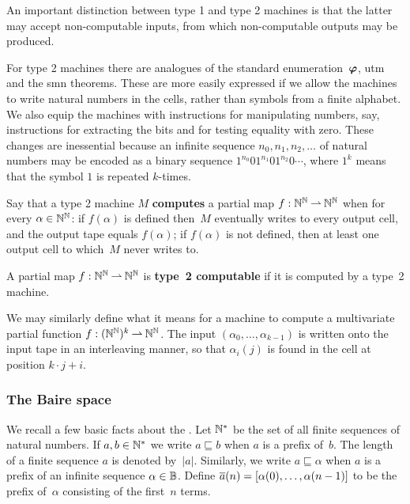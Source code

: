 An important distinction between type 1 and type 2 machines is that
the latter may accept non-computable inputs, from which non-computable
outputs may be produced.

For type 2 machines there are analogues of the standard
enumeration~$\text{\boldmath{$\varphi$}}$, utm and the smn theorems. These are more easily
expressed if we allow the machines to write natural numbers in the
cells, rather than symbols from a finite alphabet. We also equip the
machines with instructions for manipulating numbers, say, instructions
for extracting the bits and for testing equality with zero. These
changes are inessential because an infinite sequence $n_0, n_1, n_2,
\ldots$ of natural numbers may be encoded as a binary sequence
$1^{n_0}01^{n_1}01^{n_2}0\cdots$, where $1^k$ means that the symbol
$1$ is repeated $k$-times.

\begin{definition}
  Say that a type 2 machine $M$ \textbf{computes} a partial map $f : \mathbb{N}^{\mathbb{N}} \mathbin{\rightharpoonup}
  \mathbb{N}^{\mathbb{N}}$ when for every $\alpha \in \mathbb{N}^{\mathbb{N}}$:
  if $f(\alpha)$ is defined then~$M$ eventually writes to every output cell, and the output tape equals $f(\alpha)$; if $f(\alpha)$ is not defined, then at least one output cell to which~$M$ never writes to.

  A partial map $f : \mathbb{N}^{\mathbb{N}} \mathbin{\rightharpoonup} \mathbb{N}^{\mathbb{N}}$ is \textbf{type~2 computable} if it is computed by a type~2 machine.
\end{definition}

We may similarly define what it means for a machine to compute a multivariate partial function $f : (\mathbb{N}^{\mathbb{N}})^k \mathbin{\rightharpoonup} \mathbb{N}^{\mathbb{N}}$. The input $(\alpha_0, \ldots, \alpha_{k-1})$ is written onto the input tape in an interleaving manner, so that $\alpha_i(j)$ is found in the cell at position $k \cdot j + i$.

\subsubsection{The Baire space}
\label{sec:baire-space}

We recall a few basic facts about the . Let $\mathbb{N}^{*}$ be the set of all finite sequences of natural numbers. If $a, b \in \mathbb{N}^{*}$
we write $a \sqsubseteq b$ when $a$ is a prefix of~$b$. The length of a finite sequence $a$ is denoted by~$|a|$. Similarly, we write $a \sqsubseteq \alpha$ when $a$ is a prefix of an infinite sequence $\alpha \in \mathbb{B}$. Define $\overline{a}(n) = [\alpha(0), \ldots,
\alpha(n-1)]$ to be the prefix of~$\alpha$ consisting of the first~$n$ terms.

